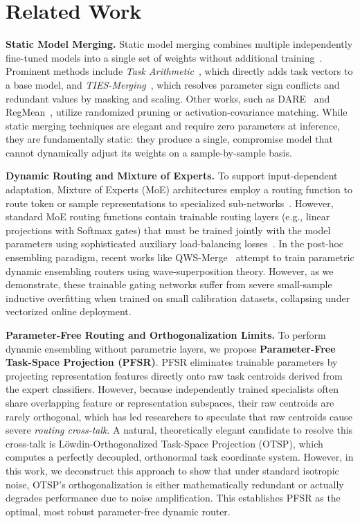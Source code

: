 \section{Related Work}
\label{sec:related}

\textbf{Static Model Merging.} Static model merging combines multiple independently fine-tuned models into a single set of weights without additional training~\cite{wortsman2022model, jin2022dataless}. Prominent methods include \textit{Task Arithmetic}~\cite{ilharco2022editing}, which directly adds task vectors to a base model, and \textit{TIES-Merging}~\cite{yadav2023ties}, which resolves parameter sign conflicts and redundant values by masking and scaling. Other works, such as DARE~\cite{yu2023language} and RegMean~\cite{choshen2022fusing}, utilize randomized pruning or activation-covariance matching. While static merging techniques are elegant and require zero parameters at inference, they are fundamentally static: they produce a single, compromise model that cannot dynamically adjust its weights on a sample-by-sample basis.

\textbf{Dynamic Routing and Mixture of Experts.} To support input-dependent adaptation, Mixture of Experts (MoE) architectures employ a routing function to route token or sample representations to specialized sub-networks~\cite{shazeer2017outrageously, fedus2022switch}. However, standard MoE routing functions contain trainable routing layers (e.g., linear projections with Softmax gates) that must be trained jointly with the model parameters using sophisticated auxiliary load-balancing losses~\cite{zoph2022designer, megablocks}. In the post-hoc ensembling paradigm, recent works like QWS-Merge~\cite{gong2024qmerge} attempt to train parametric dynamic ensembling routers using wave-superposition theory. However, as we demonstrate, these trainable gating networks suffer from severe small-sample inductive overfitting when trained on small calibration datasets, collapsing under vectorized online deployment.

\textbf{Parameter-Free Routing and Orthogonalization Limits.} To perform dynamic ensembling without parametric layers, we propose \textbf{Parameter-Free Task-Space Projection (PFSR)}. PFSR eliminates trainable parameters by projecting representation features directly onto raw task centroids derived from the expert classifiers. However, because independently trained specialists often share overlapping feature or representation subspaces, their raw centroids are rarely orthogonal, which has led researchers to speculate that raw centroids cause severe \textit{routing cross-talk}. A natural, theoretically elegant candidate to resolve this cross-talk is L{\"o}wdin-Orthogonalized Task-Space Projection (OTSP), which computes a perfectly decoupled, orthonormal task coordinate system. However, in this work, we deconstruct this approach to show that under standard isotropic noise, OTSP's orthogonalization is either mathematically redundant or actually degrades performance due to noise amplification. This establishes PFSR as the optimal, most robust parameter-free dynamic router.

